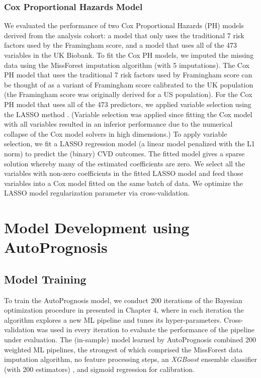 \documentclass [PhD] {uclathes}
\begin{document}
\subsubsection*{Cox Proportional Hazards Model}
We evaluated the performance of two Cox Proportional Hazards (PH) models derived from the analysis cohort: a model that only uses the traditional 7 risk factors used by the Framingham score, and a model that uses all of the 473 variables in the UK Biobank. To fit the Cox PH models, we imputed the missing data using the MissForest imputation algorithm (with 5 imputations). The Cox PH model that uses the traditional 7 risk factors used by Framingham score can be thought of as a variant of Framingham score calibrated to the UK population (the Framingham score was originally derived for a US population). For the Cox PH model that uses all of the 473 predictors, we applied variable selection using the LASSO method \cite{tibshirani1996regression}. (Variable selection was applied since fitting the Cox model with all variables resulted in an inferior performance due to the numerical collapse of the Cox model solvers in high dimensions.) To apply variable selection, we fit a LASSO regression model (a linear model penalized with the L1 norm) to predict the (binary) CVD outcomes. The fitted model gives a sparse solution whereby many of the estimated coefficients are zero. We select all the variables with non-zero coefficients in the fitted LASSO model and feed those variables into a Cox model fitted on the same batch of data. We optimize the LASSO model regularization parameter via cross-validation. 

\section{Model Development using AutoPrognosis}
\label{ch7sec2}
\subsection*{Model Training}
To train the AutoPrognosis model, we conduct 200 iterations of the Bayesian optimization procedure in presented in Chapter 4, where in each iteration the algorithm explores a new ML pipeline and tunes its hyper-parameters. Cross-validation was used in every iteration to evaluate the performance of the pipeline under evaluation. The (in-sample) model learned by AutoPrognosis combined 200 weighted ML pipelines, the strongest of which comprised the MissForest data imputation algorithm, no feature processing steps, an {\it XGBoost} ensemble classifier (with 200 estimators) \cite{chen2016xgboost}, and sigmoid regression for calibration. 
\end{document}
